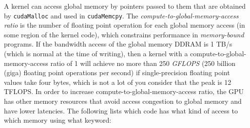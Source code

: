 \documentclass[table, xcdraw]{article}%
\begin{document}
A kernel can access global memory by pointers passed to them that are obtained by \texttt{cudaMalloc} and used in \texttt{cudaMemcpy}. The \emph{compute-to-global-memory-access ratio} is the number of floating point operation for each global memory access (in some region of the kernel code), which constrains performance in \emph{memory-bound} programs. If the bandwidth access of the global memory DDRAM is 1 TB/s (which is normal at the time of writing), then a kernel with a compute-to-global-memory-access ratio of 1 will achieve no more than 250 \emph{GFLOPS} (250 billion (giga) floating point operations per second) if single-precision floating point values take four bytes, which is not a lot of you consider that the peak is 12 TFLOPS. In order to increase compute-to-global-memory-access ratio, the GPU has other memory resources that avoid access congestion to global memory and have lower latencies. The following lists which code has what kind of access to which memory using what keyword:
\end{document}
